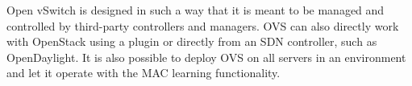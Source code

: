 Open vSwitch is designed in such a way that it is meant to be managed and controlled by third-party controllers and managers. OVS can also directly work with OpenStack using a plugin or directly from an SDN controller, such as OpenDaylight. It is also possible to deploy OVS on all servers in an environment and let it operate with the MAC learning functionality. 